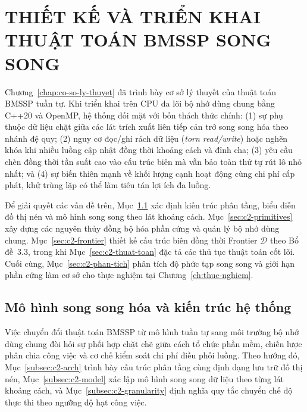 
\chapter{THIẾT KẾ VÀ TRIỂN KHAI THUẬT TOÁN BMSSP SONG SONG}\label{chap:parallel_bmssp}

Chương~\ref{chap:co-so-ly-thuyet} đã trình bày cơ sở lý thuyết của thuật toán BMSSP tuần tự. Khi triển khai trên CPU đa lõi bộ nhớ dùng chung bằng C++20 và OpenMP, hệ thống đối mặt với bốn thách thức chính: (1) sự phụ thuộc dữ liệu chặt giữa các lát trích xuất liên tiếp cản trở song song hóa theo nhánh đệ quy; (2) nguy cơ đọc/ghi rách dữ liệu (\textit{torn read/write}) hoặc nghẽn khóa khi nhiều luồng cập nhật đồng thời khoảng cách và đỉnh cha; (3) yêu cầu chèn đồng thời tần suất cao vào cấu trúc biên mà vẫn bảo toàn thứ tự rút lô nhỏ nhất; và (4) sự biến thiên mạnh về khối lượng cạnh hoạt động cùng chi phí cấp phát, khử trùng lặp có thể làm tiêu tán lợi ích đa luồng.

Để giải quyết các vấn đề trên, Mục~\ref{sec:c2-kien-truc} xác định kiến trúc phân tầng, biểu diễn đồ thị nén và mô hình song song theo lát khoảng cách. Mục~\ref{sec:c2-primitives} xây dựng các nguyên thủy đồng bộ hóa phần cứng và quản lý bộ nhớ dùng chung. Mục~\ref{sec:c2-frontier} thiết kế cấu trúc biên đồng thời Frontier $\mathcal{D}$ theo Bổ đề~3.3, trong khi Mục~\ref{sec:c2-thuat-toan} đặc tả các thủ tục thuật toán cốt lõi. Cuối cùng, Mục~\ref{sec:c2-phan-tich} phân tích độ phức tạp song song và giới hạn phần cứng làm cơ sở cho thực nghiệm tại Chương~\ref{ch:thuc-nghiem}.

\section{Mô hình song song hóa và kiến trúc hệ thống}\label{sec:c2-kien-truc}

Việc chuyển đổi thuật toán BMSSP từ mô hình tuần tự sang môi trường bộ nhớ dùng chung đòi hỏi sự phối hợp chặt chẽ giữa cách tổ chức phần mềm, chiến lược phân chia công việc và cơ chế kiểm soát chi phí điều phối luồng. Theo hướng đó, Mục~\ref{subsec:c2-arch} trình bày cấu trúc phân tầng cùng định dạng lưu trữ đồ thị nén, Mục~\ref{subsec:c2-model} xác lập mô hình song song dữ liệu theo từng lát khoảng cách, và Mục~\ref{subsec:c2-granularity} định nghĩa quy tắc chuyển chế độ thực thi theo ngưỡng độ hạt công việc.

